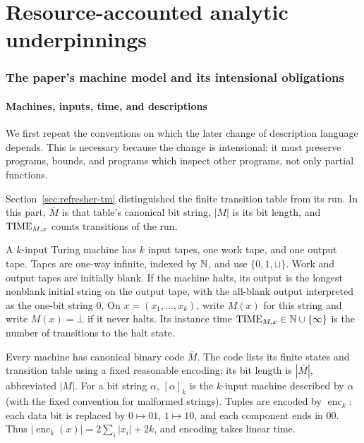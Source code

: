 
\clearpage
\setlength{\parskip}{0.55em}
\part{Resource-accounted analytic underpinnings}
\label{part:accounted}

\section{The paper's machine model and its intensional obligations}
\label{sec:paper-machines}

\subsection{Machines, inputs, time, and descriptions}

We first repeat the conventions on which the later change of description
language depends.  This is necessary because the change is intensional: it
must preserve programs, bounds, and programs which inspect other programs,
not only partial functions.

\begin{reminder}
Section~\ref{sec:refresher-tm} distinguished the finite transition table from
its run.  In this part, \(\overline M\) is that table's canonical bit string,
\(|M|\) is its bit length, and \(\operatorname{TIME}_{M,x}\) counts transitions of the run.
\end{reminder}

\begin{definition}
\label{def:paper-tm}
A \(k\)-input Turing machine has \(k\) input tapes, one work tape,
and one output tape.  Tapes are one-way infinite, indexed by \(\mathbb N\), and use
\(\{0,1,\sqcup\}\).  Work and output tapes are initially blank.  If the
machine halts, its output is the longest nonblank initial string on the output
tape, with the all-blank output interpreted as the one-bit string \(0\).  On
\(x=(x_1,\ldots,x_k)\), write \(M(x)\) for this string and write \(M(x)=\bot\)
if it never halts.  Its instance time
\(\operatorname{TIME}_{M,x}\in\mathbb N\cup\{\infty\}\) is the number of transitions to the halt
state.

Every machine has canonical binary code \(\overline M\).  The code lists its
finite states and transition table using a fixed reasonable encoding; its bit
length is \(|\overline M|\), abbreviated \(|M|\).  For a bit string
\(\alpha\), \([\alpha]_k\) is the \(k\)-input machine described by \(\alpha\)
(with the fixed convention for malformed strings).  Tuples are encoded by
\(\operatorname{enc}_k\): each data bit is replaced by
\(0\mapsto01\), \(1\mapsto10\), and each component ends in \(00\).  Thus
\(|\operatorname{enc}_k(x)|=2\sum_i|x_i|+2k\), and encoding takes linear time.
\end{definition}

